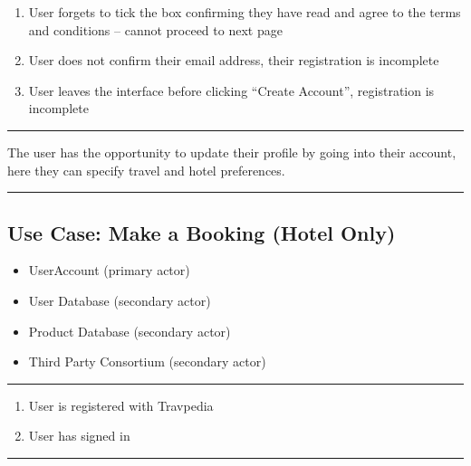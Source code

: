 \begin{enumerate}
	\item User forgets to tick the box confirming they have read and agree
		to the terms and conditions – cannot proceed to next page
	\item User does not confirm their email address, their registration is
		incomplete
	\item User leaves the interface before clicking ``Create Account'',
		registration is incomplete
\end{enumerate}
\noindent\rule{\textwidth}{0.6pt}

The user has the opportunity to update their profile by going into their
account, here they can specify travel and hotel preferences.

\noindent\rule{\textwidth}{0.6pt}

\vspace{4ex}
\hspace{-4.2cm}
\begin{minipage}[h][][s]{\linewidth}
	\subsection{Use Case: Make a Booking (Hotel Only)}
\end{minipage}

\begin{itemize}
	\item UserAccount (primary actor)
	\item User Database  (secondary actor)
	\item Product Database  (secondary actor)
	\item Third Party Consortium (secondary actor)
\end{itemize}
\noindent\rule{\textwidth}{0.6pt}

\begin{enumerate}
	\item User is registered with Travpedia
	\item User has signed in
\end{enumerate}
\noindent\rule{\textwidth}{0.6pt}

